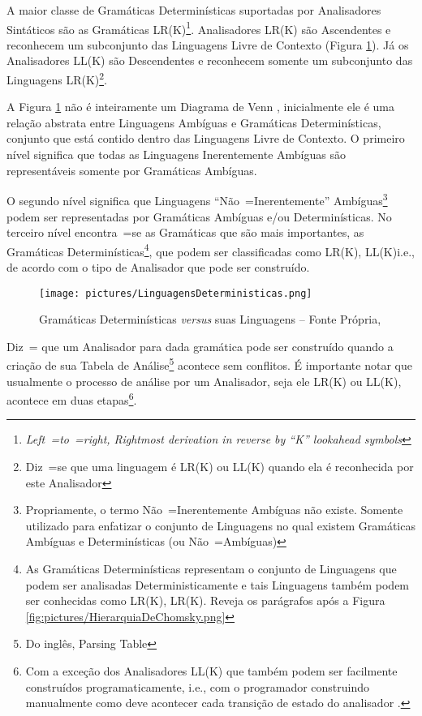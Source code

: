 {    A maior classe de Gramáticas Determinísticas suportadas por Analisadores
    Sintáticos são as Gramáticas LR(K)\footnote{\textit{Left~=to~=right,
    Rightmost derivation in reverse by ``K'' lookahead symbols
    }}.
    Analisadores LR(K) \cite{ahoCompilerDragonBook} são Ascendentes e
    reconhecem um subconjunto das Linguagens Livre de Contexto (Figura \ref{fig:pictures/LinguagensDeterministicas.png}).
    Já os Analisadores LL(K) são Descendentes \cite{antlrBookTerrentParr} e
    reconhecem somente um subconjunto das Linguagens LR(K)\footnote{Diz~=se que uma linguagem é LR(K) ou
    LL(K) quando ela é reconhecida por este Analisador}.

    A Figura \ref{fig:pictures/LinguagensDeterministicas.png} não é inteiramente um Diagrama de Venn \cite{generalizedVennDiagrams},
    inicialmente ele é uma relação abstrata entre Linguagens Ambíguas e
    Gramáticas Determinísticas,
    conjunto que está contido dentro das Linguagens Livre de Contexto.
    O primeiro nível significa que todas as Linguagens Inerentemente Ambíguas são representáveis somente por Gramáticas Ambíguas.

    O segundo nível significa que Linguagens ``Não~=Inerentemente'' Ambíguas\footnote{Propriamente,
    o termo Não~=Inerentemente Ambíguas não existe.
    Somente utilizado para enfatizar o conjunto de Linguagens no qual existem Gramáticas Ambíguas e
    Determinísticas (ou Não~=Ambíguas)} podem ser representadas por Gramáticas Ambíguas e\slash{}ou Determinísticas.
    No terceiro nível encontra~=se as Gramáticas que são mais importantes,
    as Gramáticas Determinísticas\footnote{As Gramáticas Determinísticas representam o conjunto de Linguagens que podem ser analisadas Deterministicamente e
    tais Linguagens também podem ser conhecidas como LR(K),
    LR(K).
    Reveja os parágrafos após a Figura \ref{fig:pictures/HierarquiaDeChomsky.png}
    },
    que podem ser classificadas como LR(K),
    LL(K)i.e.,
    de acordo com o tipo de Analisador que pode ser construído.
    \begin{figure}[h]
    \centering
    \texttt{[image: pictures/LinguagensDeterministicas.png]}
    \caption{Gramáticas Determinísticas \textit{versus} suas Linguagens -- Fonte Própria,
    }
    \label{fig:pictures/LinguagensDeterministicas.png}
    \end{figure}

    Diz~= que um Analisador para dada gramática pode ser construído quando a criação de sua Tabela de Análise\footnote{Do inglês,
    Parsing Table} \cite{ahoCompilerDragonBook} acontece sem conflitos.
    É importante notar que usualmente o processo de análise por um Analisador,
    seja ele LR(K) ou
    LL(K),
    acontece em duas etapas\footnote{
    Com a exceção dos Analisadores LL(K) que também podem ser facilmente construídos programaticamente,
    i.e.,
    com o programador construindo manualmente como deve acontecer cada transição de estado do analisador \cite{ahoCompilerDragonBook}.
    }.

}

